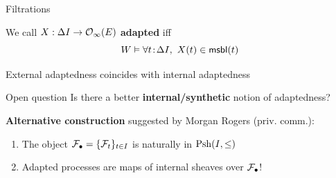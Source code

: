 \begin{frame}{Filtrations}
	\begin{definition}
		We call $X:\Delta I \to \mathcal{O}_\infty(E)$ \textbf{adapted} iff
		\begin{equation*}
			W \vDash \forall t \!:\! \Delta I,\ X(t) \in \mathsf{msbl}(t)
		\end{equation*}
	\end{definition}

	\begin{theorem}
		External adaptedness coincides with internal adaptedness
	\end{theorem}

	\vfill
	\begin{block}{Open question}
		Is there a better \textbf{internal/synthetic} notion of adaptedness?
	\end{block}

	\vfill
	\textbf{Alternative construction} suggested by Morgan Rogers (priv. comm.):
	\begin{enumerate}
		\item The object $\mathcal{F}_\bullet = \{\mathcal{F}_t\}_{t \in I}$ is naturally in $\operatorname{Psh} (I, \leq)$
		\item Adapted processes are maps of internal sheaves over $\mathcal{F}_\bullet$!
	\end{enumerate}
\end{frame}



